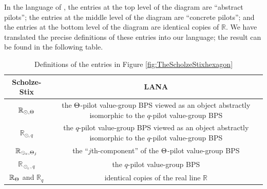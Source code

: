 \documentclass[12pt, reqno, a4paper]{amsart}
\def\bR{\mathbb{R}} %
\begin{document}
In the language of \cite{Scholze2018WhyA}, the entries at the top level of the diagram are ``abstract pilots''; the entries at the middle level of the diagram are ``concrete pilots''; and the entries at the bottom level of the diagram are identical copies of $\mathbb{R}$.
We have translated the precise definitions of these entries into our language;
the result can be found in the following table. 

\begin{table}[ht]
    \centering
    \begin{tabular}{|c|c|}
        \hline
         Scholze-Stix & LANA \\ \hline\hline
        $\bR_{\odot,\Th}$ &
        \begin{minipage}{20em}

        \medskip
        the $\Th$-pilot value-group BPS viewed as
        an object abstractly isomorphic to
        the $q$-pilot value-group BPS

        \medskip
        \end{minipage}\\ \hline
        $\bR_{\odot,q}$ &
        \begin{minipage}{20em}

        \medskip
        the $q$-pilot value-group BPS viewed as
        an object abstractly isomorphic to
        the $q$-pilot value-group BPS

        \medskip
        \end{minipage}\\ \hline
        $\bR_{\odot_c,\Th_j}$ &\begin{minipage}{20em}

        \medskip
        the ``$j$th-component'' of the $\Th$-pilot value-group BPS

        \medskip
        \end{minipage}\\ \hline
        $\bR_{\odot_c,q}$ &
        \begin{minipage}{20em}

        \medskip
        the $q$-pilot value-group BPS

        \medskip
        \end{minipage}\\ \hline
        $\bR_{\Th}$ and $\bR_{q}$ &
        \begin{minipage}{20em}

        \medskip
        identical copies of the real line $\bR$

        \medskip
        \end{minipage}\\ \hline
    \end{tabular}

    \bigskip
    \caption{Definitions of the entries in Figure \ref{fig:TheScholzeStixhexagon}}\label{tab:dictionary}
\end{table}
\end{document}
